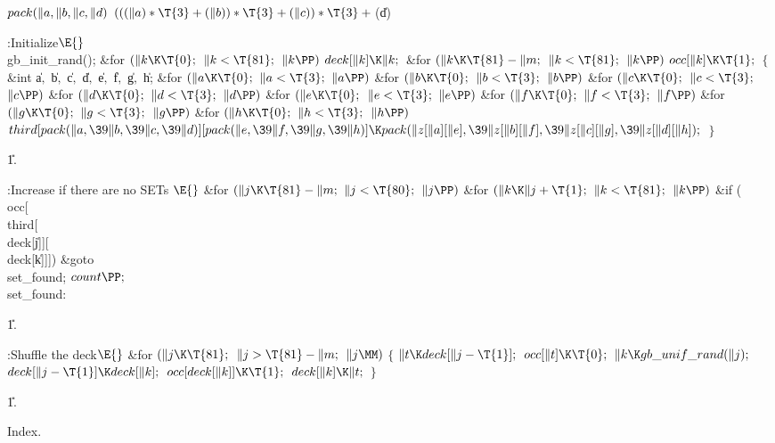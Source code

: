 \B\D$\\{pack}(\|a,\|b,\|c,\|d)$ \5
$(((\|a)*\T{3}+(\|b))*\T{3}+(\|c))*\T{3}+{}$(\|d)\par
\Y\B\4:Initialize\X${}\E{}$\6
\\{gb\_init\_rand}();\6
\&{for} ${}(\|k\K\T{0};{}$ ${}\|k<\T{81};{}$ ${}\|k\PP){}$\1\5
${}\\{deck}[\|k]\K\|k;{}$\2\6
\&{for} ${}(\|k\K\T{81}-\|m;{}$ ${}\|k<\T{81};{}$ ${}\|k\PP){}$\1\5
${}\\{occ}[\|k]\K\T{1};{}$\2\6
${}\{{}$\1\6
\&{int} \|a${},{}$ \|b${},{}$ \|c${},{}$ \|d${},{}$ \|e${},{}$ \|f${},{}$ %
\|g${},{}$ \|h;\7
\&{for} ${}(\|a\K\T{0};{}$ ${}\|a<\T{3};{}$ ${}\|a\PP){}$\1\6
\&{for} ${}(\|b\K\T{0};{}$ ${}\|b<\T{3};{}$ ${}\|b\PP){}$\1\6
\&{for} ${}(\|c\K\T{0};{}$ ${}\|c<\T{3};{}$ ${}\|c\PP){}$\1\6
\&{for} ${}(\|d\K\T{0};{}$ ${}\|d<\T{3};{}$ ${}\|d\PP){}$\1\6
\&{for} ${}(\|e\K\T{0};{}$ ${}\|e<\T{3};{}$ ${}\|e\PP){}$\1\6
\&{for} ${}(\|f\K\T{0};{}$ ${}\|f<\T{3};{}$ ${}\|f\PP){}$\1\6
\&{for} ${}(\|g\K\T{0};{}$ ${}\|g<\T{3};{}$ ${}\|g\PP){}$\1\6
\&{for} ${}(\|h\K\T{0};{}$ ${}\|h<\T{3};{}$ ${}\|h\PP){}$\1\5
${}\\{third}[\\{pack}(\|a,\39\|b,\39\|c,\39\|d)][\\{pack}(\|e,\39\|f,\39\|g,\39%
\|h)]\K\\{pack}(\|z[\|a][\|e],\39\|z[\|b][\|f],\39\|z[\|c][\|g],\39\|z[\|d][%
\|h]);{}$\2\2\2\2\2\2\2\2\6
\4${}\}{}$\2\par
\U1.\fi

\B{}:Increase  if there are no SETs%
\X${}\E{}$\6
\&{for} ${}(\|j\K\T{81}-\|m;{}$ ${}\|j<\T{80};{}$ ${}\|j\PP){}$\1\6
\&{for} ${}(\|k\K\|j+\T{1};{}$ ${}\|k<\T{81};{}$ ${}\|k\PP){}$\1\6
\&{if} (\\{occ}[\\{third}[\\{deck}[\|j]][\\{deck}[\|k]]])\1\5
\&{goto} \\{set\_found};\2\2\2\6
${}\\{count}\PP;{}$\6
\4\\{set\_found}:\par
\U1.\fi

\B{}:Shuffle the deck\X${}\E{}$\6
\&{for} ${}(\|j\K\T{81};{}$ ${}\|j>\T{81}-\|m;{}$ ${}\|j\MM){}$\5
${}\{{}$\1\6
${}\|t\K\\{deck}[\|j-\T{1}];{}$\6
${}\\{occ}[\|t]\K\T{0};{}$\6
${}\|k\K\\{gb\_unif\_rand}(\|j);{}$\6
${}\\{deck}[\|j-\T{1}]\K\\{deck}[\|k];{}$\6
${}\\{occ}[\\{deck}[\|k]]\K\T{1};{}$\6
${}\\{deck}[\|k]\K\|t;{}$\6
\4${}\}{}$\2\par
\U1.\fi

Index.

\fi


\inx
\fin
\con

